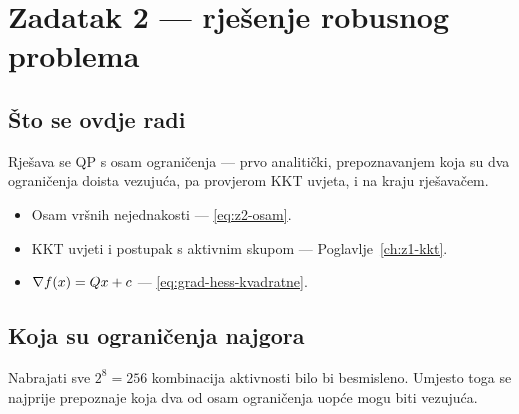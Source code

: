 \chapter{Zadatak 2 --- rješenje robusnog problema}
\label{ch:z2-rjesenje}

\section{Što se ovdje radi}

Rješava se QP s osam ograničenja --- prvo analitički, prepoznavanjem koja su dva
ograničenja doista vezujuća, pa provjerom KKT uvjeta, i na kraju rješavačem.

\begin{predznanje}
\begin{itemize}[nosep,leftmargin=*]
  \item Osam vršnih nejednakosti --- \eqref{eq:z2-osam}.
  \item KKT uvjeti i postupak s aktivnim skupom --- Poglavlje~\ref{ch:z1-kkt}.
  \item $\nabla f(x) = Qx + c$ --- \eqref{eq:grad-hess-kvadratne}.
\end{itemize}
\end{predznanje}

\section{Koja su ograničenja najgora}
\label{sec:z2-najgora}

Nabrajati sve $2^8 = 256$ kombinacija aktivnosti bilo bi besmisleno. Umjesto
toga se najprije prepoznaje koja dva od osam ograničenja uopće mogu biti
vezujuća.

